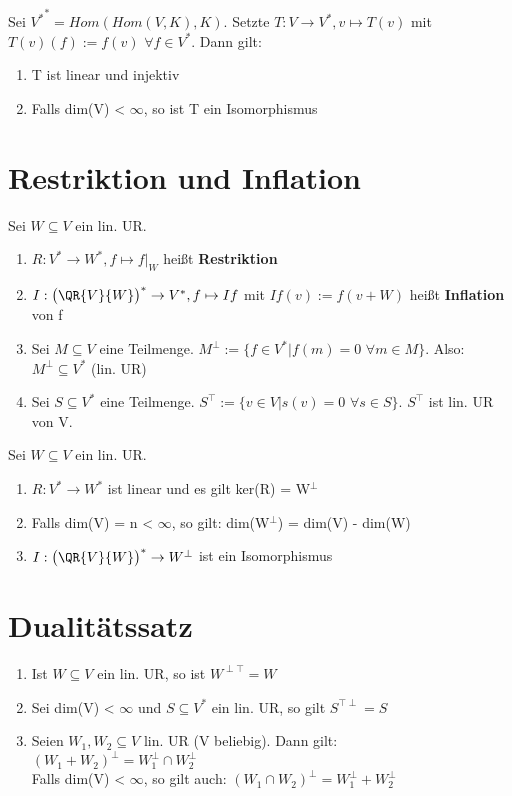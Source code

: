 \begin{proposition}
Sei ${V^*}^* = Hom(Hom(V,K), K)$. Setzte $T: V \to V^*, v \mapsto T(v)$ mit $T(v)(f) := f(v)$ $\forall f \in V^*$. Dann gilt:
\begin{enumerate}
\item T ist linear und injektiv
\item Falls dim(V) < $\infty$, so ist T ein Isomorphismus
\end{enumerate}
\end{proposition}

\section{Restriktion und Inflation}
\begin{definition}
Sei $W \subseteq V$ ein lin. UR.
\begin{enumerate}
\item $R: V^* \to W^*, f \mapsto f|_W$ heißt \textbf{Restriktion}
\item $I: \big(\QR{V}{W}\big)^* \to V^*, f \mapsto If$ mit $If(v) := f(v + W)$ heißt \textbf{Inflation} von f
\item Sei $M \subseteq V$ eine Teilmenge. $M^\perp := \{ f \in V^* | f(m) = 0$ $\forall m \in M \}$. Also: $M^\perp \subseteq V^*$ (lin. UR)
\item Sei $S \subseteq V^*$ eine Teilmenge. $S^\top := \{ v \in V | s(v) = 0$ $\forall s \in S \}$. $S^\top$ ist lin. UR von V.
\end{enumerate}
\end{definition}

\begin{lemma}
Sei $W \subseteq V$ ein lin. UR.
\begin{enumerate}
\item $R: V^* \to W^*$ ist linear und es gilt ker(R) = W$^\perp$
\item Falls dim(V) = n < $\infty$, so gilt: dim(W$^\perp$) = dim(V) - dim(W)
\item $I: \big(\QR{V}{W}\big)^* \to W^\perp$ ist ein Isomorphismus
\end{enumerate}
\end{lemma}

\section{Dualitätssatz}
\begin{theorem}
\leavevmode
\begin{enumerate}
\item Ist $W \subseteq V$ ein lin. UR, so ist $W^{\perp \top} = W$
\item Sei dim(V) < $\infty$ und $S \subseteq V^*$ ein lin. UR, so gilt  $S^{\top \perp} = S$
\item Seien $W_1, W_2 \subseteq V$ lin. UR (V beliebig). Dann gilt:\\
$(W_1 + W_2)^\perp = W_1^\perp \cap W_2^\perp$\\
Falls dim(V) < $\infty$, so gilt auch: $(W_1 \cap W_2)^\perp = W_1^\perp + W_2^\perp$
\end{enumerate}
\end{theorem}

